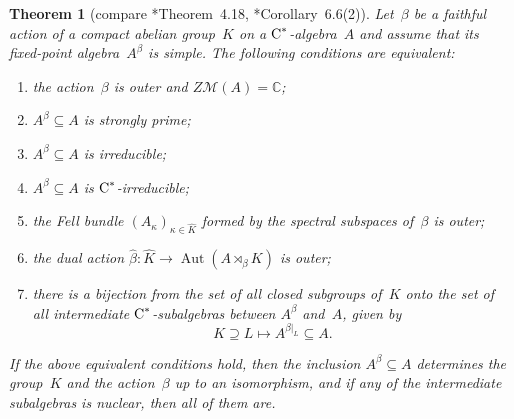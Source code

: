 \documentclass[a4paper]{amsart}
\theoremstyle{plain}
\newtheorem{theorem}{Theorem}
\theoremstyle{definition}
\theoremstyle{remark}
\numberwithin{theorem}{section}
\numberwithin{equation}{section}
\DeclareMathOperator{\Aut}{Aut}%
\newcommand*{\nb}{\nobreakdash}
\newcommand*{\C}{\mathbb C}
\newcommand*{\Cst}{\textup C^*}%
\newcommand*{\Mult}{\mathcal M}%
\begin{document}
\begin{theorem}[compare \cite{Mukohara:Inclusions}*{Theorem~4.18},
  \cite{Izumi:Inclusions_simple}*{Corollary~6.6(2)}]
  \label{thm:Mukohara_compact_abelian}
  Let~\(\beta\) be a faithful action of a compact abelian group~\(K\)
  on a \(\Cst\)\nb-algebra~\(A\) and assume that its fixed-point
  algebra~\(A^\beta\)  is simple.
  The following conditions are equivalent:
  \begin{enumerate}
  \item \label{enu:Mukohara_compact_abelian8}%
    the action~\(\beta\) is outer and \(Z\Mult(A)=\C\);
  \item \label{enu:Mukohara_compact_abelian0}%
    \(A^\beta\subseteq A\) is strongly prime; %
  \item \label{enu:Mukohara_compact_abelian1}%
    \(A^\beta\subseteq A\) is irreducible;
  \item \label{enu:Mukohara_compact_abelian2}%
    \(A^\beta\subseteq A\) is \(\Cst\)\nb-irreducible;
  \item \label{enu:Mukohara_compact_abelian6}%
    the Fell bundle \((A_{\kappa})_{\kappa\in\widehat{K}}\) formed by
    the spectral subspaces of~\(\beta\) is outer;
  \item \label{enu:Mukohara_compact_abelian7}%
    the dual action \(\widehat{\beta}\colon \widehat{K}\to
    \Aut(A\rtimes_\beta K)\) is outer;
  \item \label{enu:Mukohara_compact_abelian9}%
    there is a bijection from the set of all closed subgroups of~\(K\)
    onto the set of all intermediate \(\Cst\)\nb-subalgebras between \(A^\beta\) and~\(A\), given by
    \[
      K\supseteq L \mapsto A^{\beta|_L} \subseteq A.
    \]
  \end{enumerate}
  If the above equivalent conditions hold, then the inclusion
  \(A^\beta\subseteq A\) determines the group~\(K\) and the
  action~\(\beta\) up to an isomorphism, and if any of the
  intermediate subalgebras is nuclear, then all of them are.
\end{theorem}
\end{document}
